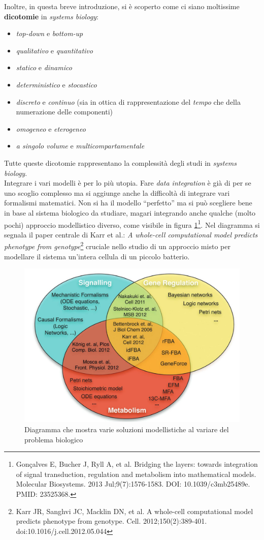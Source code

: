 \documentclass[a4paper,12pt, oneside]{book}
\begin{document}
Inoltre, in questa breve introduzione, si è scoperto come ci siano moltissime
\textbf{dicotomie} in \textit{systems biology}:
\begin{itemize}
  \item \textit{top-down} e \textit{bottom-up}
  \item \textit{qualitativo} e \textit{quantitativo}
  \item \textit{statico} e \textit{dinamico}
  \item \textit{deterministico} e \textit{stocastico}
  \item \textit{discreto} e \textit{continuo} (sia in ottica di
  rappresentazione del \textit{tempo} che della numerazione delle componenti)
  \item \textit{omogeneo} e \textit{eterogeneo}
  \item \textit{a singolo volume} e \textit{multicompartamentale}
\end{itemize}
Tutte queste dicotomie rappresentano la complessità degli studi in
\textit{systems biology}.\\
Integrare i vari modelli è per lo più utopia. Fare \textit{data integration} è
già di per se uno scoglio complesso ma si aggiunge anche la difficoltà di
integrare vari formalismi matematici. Non si ha il modello ``perfetto'' ma si
può scegliere bene in base al sistema biologico da studiare, magari integrando
anche qualche (molto pochi) approccio modellistico diverso, come visibile in
figura \ref{fig:pap}\footnote{Gonçalves E, Bucher J, Ryll A, et al. Bridging the
  layers: towards integration of signal transduction, regulation and metabolism
  into mathematical models. Molecular Biosystems. 2013 Jul;9(7):1576-1583. DOI:
  10.1039/c3mb25489e. PMID: 23525368. }. Nel diagramma si segnala il paper
centrale di Karr et al.: \textit{A whole-cell computational model predicts
  phenotype from genotype}\footnote{Karr JR, Sanghvi JC, Macklin DN, et al. A
  whole-cell computational model predicts phenotype from
  genotype. Cell. 2012;150(2):389-401. doi:10.1016/j.cell.2012.05.044} cruciale
nello studio di un approccio misto per modellare il sistema un'intera cellula di
un piccolo batterio.
\begin{figure}
  \centering
  \includegraphics[scale = 0.25]{img/papers.jpg}
  \caption{Diagramma che mostra varie soluzioni modellistiche al variare del
    problema biologico}
  \label{fig:pap}
\end{figure}
\end{document}
